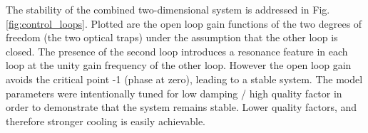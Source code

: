 The stability of the combined two-dimensional system is addressed in Fig.\ref{fig:control_loops}. Plotted are the open loop gain functions of the two degrees of freedom (the two optical traps) under the assumption that the other loop is closed. The presence of the second loop introduces a resonance feature in each loop at the unity gain frequency of the other loop. However the open loop gain avoids the critical point -1 (phase at zero), leading to a stable system. The model parameters were intentionally tuned for low damping / high quality factor in order to demonstrate that the system remains stable. Lower quality factors, and therefore stronger cooling is easily achievable.

%


